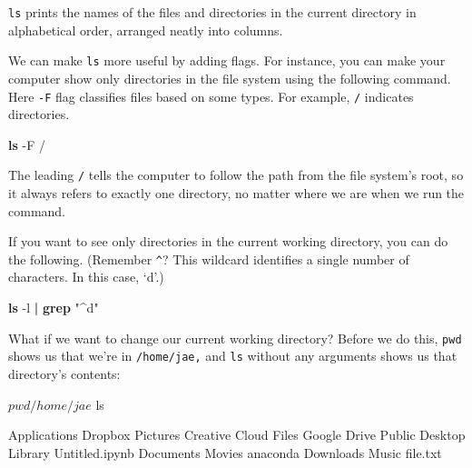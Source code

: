 \documentclass[
]{book}
\newenvironment{Shaded}{\begin{snugshade}}{\end{snugshade}}
\newcommand{\AttributeTok}[1]{\textcolor[rgb]{0.13,0.29,0.53}{#1}}
\newcommand{\ExtensionTok}[1]{#1}
\newcommand{\FunctionTok}[1]{\textcolor[rgb]{0.13,0.29,0.53}{\textbf{#1}}}
\newcommand{\KeywordTok}[1]{\textcolor[rgb]{0.13,0.29,0.53}{\textbf{#1}}}
\newcommand{\NormalTok}[1]{#1}
\newcommand{\StringTok}[1]{\textcolor[rgb]{0.31,0.60,0.02}{#1}}
\begin{document}
\texttt{ls} prints the names of the files and directories in the current directory in alphabetical order, arranged neatly into columns.

We can make \texttt{ls} more useful by adding flags. For instance, you can make your computer show only directories in the file system using the following command. Here \texttt{-F} flag classifies files based on some types. For example, \texttt{/} indicates directories.

\begin{Shaded}
\begin{Highlighting}[]
\FunctionTok{ls} \AttributeTok{{-}F}\NormalTok{ /}
\end{Highlighting}
\end{Shaded}

The leading \texttt{/} tells the computer to follow the path from the file system's root, so it always refers to exactly one directory, no matter where we are when we run the command.

If you want to see only directories in the current working directory, you can do the following. (Remember \texttt{\^{}}? This wildcard identifies a single number of characters. In this case, `d'.)

\begin{Shaded}
\begin{Highlighting}[]
\FunctionTok{ls} \AttributeTok{{-}l} \KeywordTok{|} \FunctionTok{grep} \StringTok{"\^{}d"}
\end{Highlighting}
\end{Shaded}

What if we want to change our current working directory? Before we do this, \texttt{pwd} shows us that we're in \texttt{/home/jae,} and \texttt{ls} without any arguments shows us that directory's contents:

\begin{Shaded}
\begin{Highlighting}[]
\ExtensionTok{$}\NormalTok{ pwd}

\ExtensionTok{/home/jae}

\ExtensionTok{$}\NormalTok{ ls}

\ExtensionTok{Applications}\NormalTok{        Dropbox         Pictures}
\ExtensionTok{Creative}\NormalTok{ Cloud Files    Google Drive        Public}
\ExtensionTok{Desktop}\NormalTok{         Library         Untitled.ipynb}
\ExtensionTok{Documents}\NormalTok{       Movies          anaconda}
\ExtensionTok{Downloads}\NormalTok{       Music           file.txt}
\end{Highlighting}
\end{Shaded}
\end{document}
